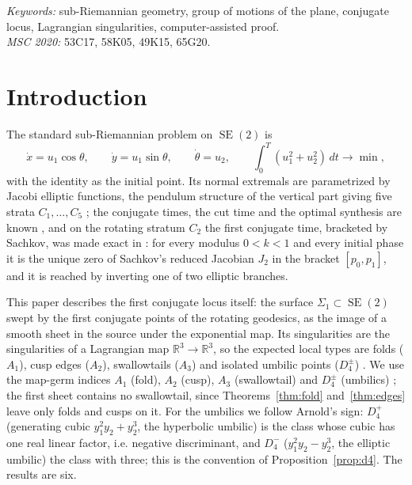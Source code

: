 \documentclass[11pt]{article}
\theoremstyle{remark}
\newcommand{\SE}{\operatorname{SE}(2)}
\begin{document}
\noindent\textit{Keywords:} sub-Riemannian geometry, group of motions of the plane, conjugate locus, Lagrangian singularities, computer-assisted proof.\\
\textit{MSC 2020:} 53C17, 58K05, 49K15, 65G20.

\section{Introduction}

The standard sub-Riemannian problem on $\SE$ is
\begin{equation}\label{eq:control-system}
 \dot x=u_1\cos\theta,\qquad \dot y=u_1\sin\theta,\qquad \dot\theta=u_2,
 \qquad \int_0^T(u_1^2+u_2^2)\,dt\to\min,
\end{equation}
with the identity as the initial point.  Its normal extremals are
parametrized by Jacobi elliptic functions, the pendulum structure of the
vertical part giving five strata $C_1,\dots,C_5$
\cite{MoiseevSachkov2010Maxwell}; the conjugate times, the cut time and the
optimal synthesis are known \cite{Sachkov2010Conjugate,Sachkov2011CutLocus},
and on the rotating stratum $C_2$ the first conjugate time, bracketed by
Sachkov, was made exact in
\cite{SE2FirstConjugate}: for every modulus $0<k<1$ and every initial phase
it is the unique zero of Sachkov's reduced Jacobian $J_2$ in the bracket
$[p_0,p_1]$, and it is reached by inverting one of two elliptic branches.

This paper describes the first conjugate locus itself: the surface
$\Sigma_1\subset\SE$ swept by the first conjugate points of the rotating
geodesics, as the image of a smooth sheet in the source under the
exponential map.  Its singularities are the singularities of a Lagrangian
map $\mathbb R^3\to\mathbb R^3$, so the expected local types are folds
($A_1$), cusp edges ($A_2$), swallowtails ($A_3$) and isolated umbilic
points ($D_4^\pm$) \cite{Arnold1972NormalForms}.  We use the map-germ indices $A_1$ (fold),
$A_2$ (cusp), $A_3$ (swallowtail) and $D_4^\pm$ (umbilics)
\cite{Whitney1955,GolubitskyGuillemin1973,Arnold1972NormalForms}; the
first sheet contains no swallowtail, since Theorems~\ref{thm:fold}
and~\ref{thm:edges} leave only folds and cusps on it.  For the umbilics we
follow Arnold's sign: $D_4^+$ (generating cubic $y_1^2y_2+y_2^3$, the
hyperbolic umbilic) is the class whose cubic has one real linear factor,
i.e. negative discriminant, and $D_4^-$ ($y_1^2y_2-y_2^3$, the elliptic
umbilic) the class with three; this is the convention of
Proposition~\ref{prop:d4}.  The results are six.
\end{document}
